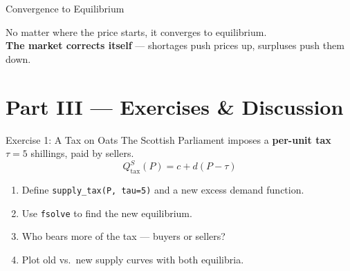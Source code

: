\documentclass[aspectratio=169, 10pt]{beamer}
\begin{document}
\begin{frame}{Convergence to Equilibrium}
\begin{center}
\end{center}
\vspace{0.5em}
No matter where the price starts, it converges to equilibrium.\\[4pt]
\textbf{The market corrects itself} --- shortages push prices up,
surpluses push them down.
\end{frame}

\section{Part III --- Exercises \& Discussion}

\begin{frame}{Exercise 1: A Tax on Oats}
The Scottish Parliament imposes a \textbf{per-unit tax} $\tau = 5$ shillings,
paid by sellers.
\vspace{0.5em}
\[
  Q^S_{\text{tax}}(P) = c + d(P - \tau)
\]
\vspace{0.3em}
\begin{enumerate}
  \item Define \texttt{supply\_tax(P, tau=5)} and a new excess demand function.
  \item Use \texttt{fsolve} to find the new equilibrium.
  \item Who bears more of the tax --- buyers or sellers?
  \item Plot old vs.\ new supply curves with both equilibria.
\end{enumerate}
\end{frame}
\end{document}
